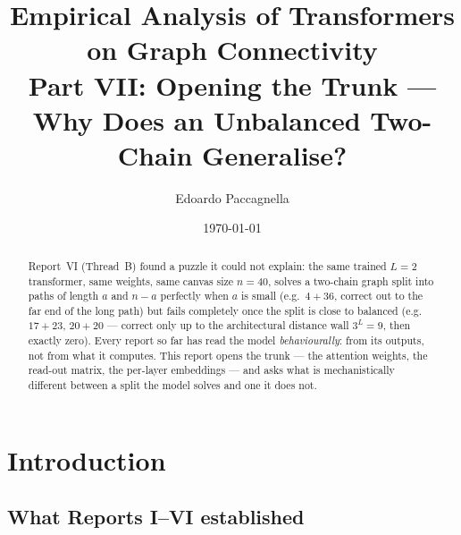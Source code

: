 \documentclass[11pt,a4paper]{article}
\title{Empirical Analysis of Transformers on Graph Connectivity \\
       \large Part VII: Opening the Trunk --- Why Does an Unbalanced Two-Chain Generalise?}
\author{Edoardo Paccagnella}
\date{\today}
\begin{document}
\maketitle

%

\begin{abstract}
\noindent Report~VI (Thread~B) found a puzzle it could not explain: the same
trained $L{=}2$ transformer, same weights, same canvas size $n{=}40$, solves a
two-chain graph split into paths of length $a$ and $n-a$ perfectly when $a$ is
small (e.g.\ $4{+}36$, correct out to the far end of the long path) but fails
completely once the split is close to balanced (e.g.\ $17{+}23$, $20{+}20$ ---
correct only up to the architectural distance wall $3^L{=}9$, then exactly zero).
Every report so far has read the model \emph{behaviourally}: from its outputs, not
from what it computes. This report opens the trunk --- the attention weights, the
read-out matrix, the per-layer embeddings --- and asks what is mechanistically
different between a split the model solves and one it does not.
\end{abstract}

\section{Introduction}
\label{sec:intro}

\subsection{What Reports I--VI established}
\label{sec:recap}
\end{document}
